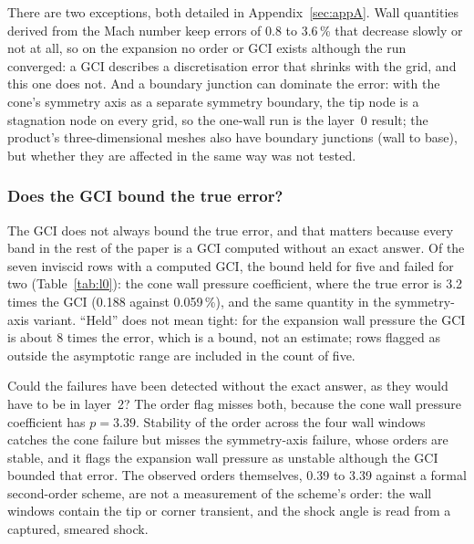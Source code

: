 \documentclass[twocolumn]{labreport}
\begin{document}
There are two exceptions, both detailed in Appendix~\ref{sec:appA}.
Wall quantities derived from the Mach number keep errors of 0.8 to 3.6\,\% that decrease slowly or not at all, so on the expansion no order or GCI exists although the run converged: a GCI describes a discretisation error that shrinks with the grid, and this one does not.
And a boundary junction can dominate the error: with the cone's symmetry axis as a separate symmetry boundary, the tip node is a stagnation node on every grid, so the one-wall run is the layer~0 result; the product's three-dimensional meshes also have boundary junctions (wall to base), but whether they are affected in the same way was not tested.

\subsubsection{Does the GCI bound the true error?}
\label{sec:gcibound}

The GCI does not always bound the true error, and that matters because every band in the rest of the paper is a GCI computed without an exact answer.
Of the seven inviscid rows with a computed GCI, the bound held for five and failed for two (Table~\ref{tab:l0}): the cone wall pressure coefficient, where the true error is 3.2 times the GCI (0.188 against 0.059\,\%), and the same quantity in the symmetry-axis variant.
``Held'' does not mean tight: for the expansion wall pressure the GCI is about 8 times the error, which is a bound, not an estimate; rows flagged as outside the asymptotic range are included in the count of five.

Could the failures have been detected without the exact answer, as they would have to be in layer~2?
The order flag misses both, because the cone wall pressure coefficient has $p=3.39$.
Stability of the order across the four wall windows catches the cone failure but misses the symmetry-axis failure, whose orders are stable, and it flags the expansion wall pressure as unstable although the GCI bounded that error.
The observed orders themselves, 0.39 to 3.39 against a formal second-order scheme, are not a measurement of the scheme's order: the wall windows contain the tip or corner transient, and the shock angle is read from a captured, smeared shock.
\end{document}
